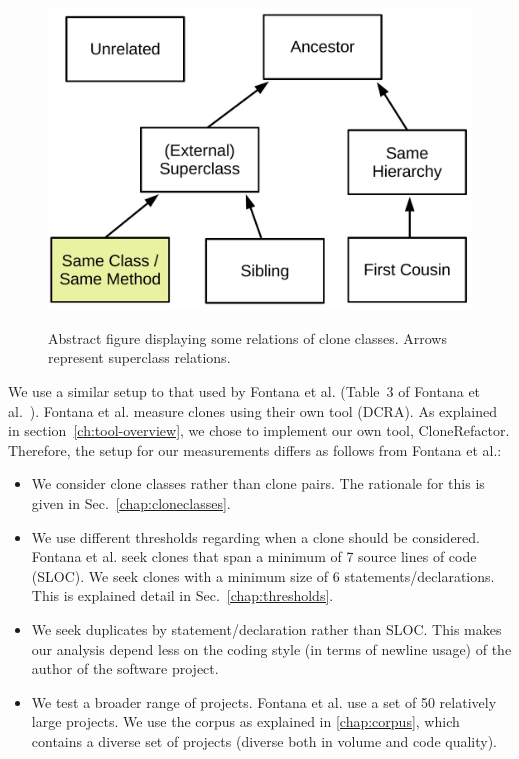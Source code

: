 \documentclass[a4paper]{article}
\begin{document}
\begin{figure}[H]
  \caption{Abstract figure displaying some relations of clone classes. Arrows represent superclass relations.}
    \medskip
    \includegraphics[width=1\columnwidth]{img/Relation}
  \label{fig:clonerelation}
\end{figure}

We use a similar setup to that used by Fontana et al. (Table~3 of Fontana et al.~\cite{fontana2015duplicated}). Fontana et al. measure clones using their own tool (DCRA). As explained in section~\ref{ch:tool-overview}, we chose to implement our own tool, CloneRefactor. Therefore, the setup for our measurements differs as follows from Fontana et al.:
\begin{itemize}
  \item We consider clone classes rather than clone pairs. The rationale for this is given in Sec.~\ref{chap:cloneclasses}.
\item We use different thresholds regarding when a clone should be considered. Fontana et al. seek clones that span a minimum of 7 source lines of code (SLOC). We seek clones with a minimum size of 6 statements/declarations. This is explained detail in Sec.~\ref{chap:thresholds}.
\item We seek duplicates by statement/declaration rather than SLOC. This makes our analysis depend less on the coding style (in terms of newline usage) of the author of the software project.
\item We test a broader range of projects. Fontana et al. use a set of 50 relatively large projects. We use the corpus as explained in \ref{chap:corpus}, which contains a diverse set of projects (diverse both in volume and code quality).
\end{itemize}
\end{document}
